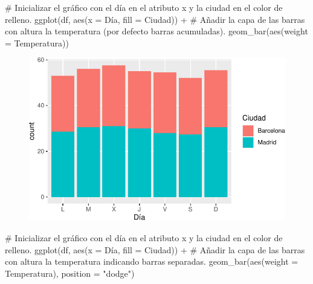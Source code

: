 \documentclass[
  a4paper,
]{scrreport}
\newenvironment{Shaded}{\begin{snugshade}}{\end{snugshade}}
\newcommand{\AttributeTok}[1]{\textcolor[rgb]{0.40,0.45,0.13}{#1}}
\newcommand{\CommentTok}[1]{\textcolor[rgb]{0.37,0.37,0.37}{#1}}
\newcommand{\FunctionTok}[1]{\textcolor[rgb]{0.28,0.35,0.67}{#1}}
\newcommand{\NormalTok}[1]{\textcolor[rgb]{0.00,0.23,0.31}{#1}}
\newcommand{\SpecialCharTok}[1]{\textcolor[rgb]{0.37,0.37,0.37}{#1}}
\newcommand{\StringTok}[1]{\textcolor[rgb]{0.13,0.47,0.30}{#1}}
\theoremstyle{definition}
\theoremstyle{definition}
\theoremstyle{remark}
\begin{document}
\begin{Shaded}
\begin{Highlighting}[]
\CommentTok{\# Inicializar el gráfico con el día en el atributo x y la ciudad en el color de relleno.}
\FunctionTok{ggplot}\NormalTok{(df, }\FunctionTok{aes}\NormalTok{(}\AttributeTok{x =}\NormalTok{ Día, }\AttributeTok{fill =}\NormalTok{ Ciudad)) }\SpecialCharTok{+}
\CommentTok{\# Añadir la capa de las barras con altura la temperatura (por defecto barras acumuladas).}
    \FunctionTok{geom\_bar}\NormalTok{(}\FunctionTok{aes}\NormalTok{(}\AttributeTok{weight =}\NormalTok{ Temperatura))}
\end{Highlighting}
\end{Shaded}

\begin{figure}[H]

{\centering \includegraphics{./07-graficos_files/figure-pdf/unnamed-chunk-11-1.pdf}

}

\end{figure}

\begin{Shaded}
\begin{Highlighting}[]
\CommentTok{\# Inicializar el gráfico con el día en el atributo x y la ciudad en el color de relleno.}
\FunctionTok{ggplot}\NormalTok{(df, }\FunctionTok{aes}\NormalTok{(}\AttributeTok{x =}\NormalTok{ Día, }\AttributeTok{fill =}\NormalTok{ Ciudad)) }\SpecialCharTok{+}
\CommentTok{\# Añadir la capa de las barras con altura la temperatura indicando barras separadas.}
    \FunctionTok{geom\_bar}\NormalTok{(}\FunctionTok{aes}\NormalTok{(}\AttributeTok{weight =}\NormalTok{ Temperatura), }\AttributeTok{position =} \StringTok{"dodge"}\NormalTok{)}
\end{Highlighting}
\end{Shaded}
\end{document}
